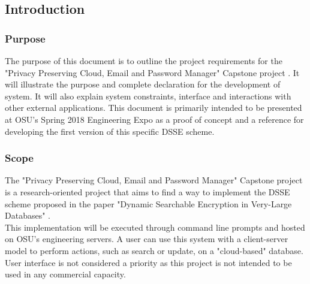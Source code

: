         
      

\subsection{ Introduction }
\subsubsection{ Purpose }
The purpose of this document is to outline the project requirements for the "Privacy Preserving Cloud, Email and Password Manager" Capstone project \cite{capstone}. It will illustrate the purpose and complete declaration for the development of system. It will also explain system constraints, interface and interactions with other external applications. This document is primarily intended to be presented at OSU's Spring 2018 Engineering Expo as a proof of concept and a reference for developing the first version of this specific DSSE scheme.
\subsubsection{ Scope }
The "Privacy Preserving Cloud, Email and Password Manager" Capstone project is a research-oriented project that aims to find a way to implement the DSSE scheme proposed in the paper "Dynamic Searchable Encryption in Very-Large Databases" \cite{cash14}.\\
This implementation will be executed through command line prompts and hosted on OSU's engineering servers. A user can use this system with a client-server model to perform actions, such as search or update, on a "cloud-based" database. User interface is not considered a priority as this project is not intended to be used in any commercial capacity. 

